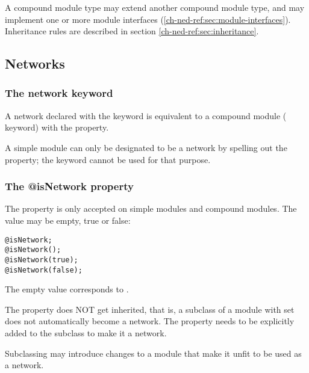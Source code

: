 A compound module type may extend another compound module type, and
may implement one or more module interfaces (\ref{ch-ned-ref:sec:module-interfaces}).
Inheritance rules are described in section \ref{ch-ned-ref:sec:inheritance}.



\subsection{Networks}
\label{ch-ned-ref:sec:networks}

\subsubsection{The network keyword}

A network declared with the  keyword is equivalent to a compound
module ( keyword) with the  property.

\begin{note}
    A simple module can only be designated to be a network by spelling out the
     property; the  keyword cannot
    be used for that purpose.
\end{note}

\subsubsection{The @isNetwork property}

The  property is only accepted on simple modules and
compound modules. The value may be empty, true or false:

\begin{verbatim}
@isNetwork;
@isNetwork();
@isNetwork(true);
@isNetwork(false);
\end{verbatim}

The empty value corresponds to .

The  property does NOT get inherited, that is, a subclass
of a module with  set does not automatically become a network.
The  property needs to be explicitly added to the subclass
to make it a network.

\begin{rationale}
    Subclassing may introduce changes to a module that make it unfit to be used
    as a network.
\end{rationale}



